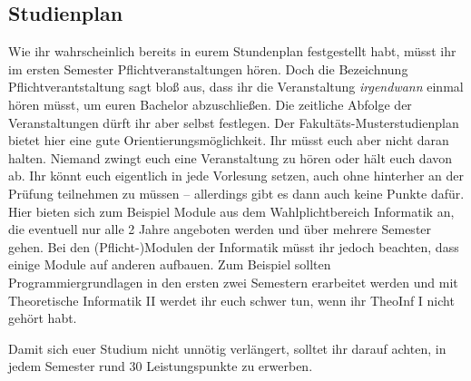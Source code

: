 \subsection{Studienplan}
	\label{bach_studienplan}
	Wie ihr wahrscheinlich bereits in eurem Stundenplan festgestellt habt, müsst ihr im ersten Semester \iftoggle{winter}{vier}{fünf} Pflichtveranstaltungen hören. Doch die Bezeichnung Pflichtverantstaltung sagt bloß aus, dass ihr die Veranstaltung \emph{irgendwann} einmal hören müsst, um euren Bachelor abzuschließen. Die zeitliche Abfolge der Veranstaltungen dürft ihr aber selbst festlegen. Der Fakultäts-Musterstudienplan bietet hier eine gute Orientierungsmöglichkeit. Ihr müsst euch aber nicht daran halten. Niemand zwingt euch eine Veranstaltung zu hören oder hält euch davon ab. Ihr könnt euch eigentlich in jede Vorlesung setzen, auch ohne hinterher an der Prüfung teilnehmen zu müssen -- allerdings gibt es dann auch keine Punkte dafür. Hier bieten sich zum Beispiel Module aus dem Wahlplichtbereich Informatik an, die eventuell nur alle 2 Jahre angeboten werden und über mehrere Semester gehen. Bei den (Pflicht-)Modulen der Informatik müsst ihr jedoch beachten, dass einige Module auf anderen aufbauen. Zum Beispiel sollten Programmiergrundlagen in den ersten zwei Semestern erarbeitet werden und mit Theoretische Informatik II werdet ihr euch schwer tun, wenn ihr TheoInf I nicht gehört habt.

	Damit sich euer Studium nicht unnötig verlängert, solltet ihr darauf achten, in jedem Semester rund 30 Leistungspunkte zu erwerben. 
